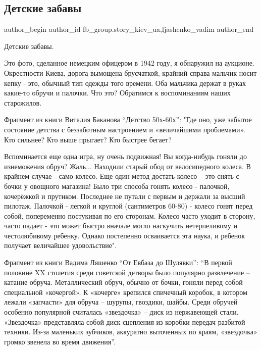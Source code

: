  
 
 
 
 
 
\subsection{Детские забавы}
\label{sec:20_01_2022.fb.fb_group.story_kiev_ua.1.detstkie_zabavy}
 
\ifcmt
 author_begin
   author_id fb_group.story_kiev_ua,ljashenko_vadim
 author_end
\fi

Детские забавы. 

Это фото, сделанное немецким офицером в 1942 году, я обнаружил на аукционе.
Окрестности Киева, дорога вымощена брусчаткой, крайний справа мальчик носит
кепку - это, обычный тип одежды того времени. Оба мальчика держат в руках
какие-то обручи и палочки. Что это? Обратимся к воспоминаниям наших старожилов.


Фрагмент из книги Виталия Баканова \enquote{Детство 50х-60х}: "Где оно, уже забытое
состояние детства с беззаботным настроением и «величайшими проблемами». Кто
сильнее? Кто выше прыгает? Кто быстрее бегает?

Вспоминается еще одна игра, ну очень подвижная! Вы когда-нибудь гоняли до
изнеможения обруч? Жаль... Находили старый обод от велосипедного колеса. В
крайнем случае -  само колесо.  Еще один метод достать колесо – это снять с
бочки у овощного магазина! Было три способа гонять колесо - палочкой,
кочерёжкой и прутиком. Последнее не путали с первым и держали за высший
пилотаж. Палочкой - легкой и круглой (сантиметров 60-80) - колесо гонят перед
собой, попеременно постукивая по его сторонам. Колесо часто уходит в сторону,
часто падает - это может быстро вначале могло наскучить нетерпеливому и
честолюбивому ребенку. Однако постепенно осваивается эта наука, и ребенок
получает величайшее удовольствие".

Фрагмент из книги Вадима Ляшенко \enquote{От Евбаза до Шулявки}: \enquote{В первой половине XX
столетия среди советской детворы было популярно развлечение – катание обруча.
Металлический обруч, обычно от бочки, гоняли перед собой специальной
«кочергой». К «кочерге» крепился спичечный коробок, в котором лежали «запчасти»
для обруча – шурупы, гвоздики, шайбы. Среди обручей особенно популярной
считалась «звездочка» – диск из нержавеющей стали. «Звездочка» представляла
собой диск сцепления из коробки передач разбитой техники. Из-за маленьких
зубчиков, аккуратно выточенных по краям, «звездочка» громко звенела во время
движения}.

